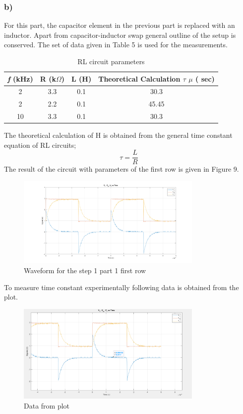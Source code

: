 \documentclass[letterpaper,12pt]{article}
\begin{document}
\subsubsection{b)}
For this part, the capacitor element in the previous part is replaced with an inductor. Apart from capacitor-inductor swap general outline of the setup is conserved.
The set of data given in Table 5 is used for the measurements.

\begin{table}[H]
\begin{center}
\caption{RL circuit parameters}
\vspace{2mm}
	\begin{tabular}{||c | c | c | c||} 
	 \hline
	 \emph{f} (kHz) & R (k\(\Omega\)) & L (H) & Theoretical Calculation \(\tau\) \(\mu\) ( sec) \\ [0.5ex] 
	 \hline\hline
	 2 & 3.3 & 0.1 & 30.3 \\ 
	 \hline
	 2 & 2.2 & 0.1 & 45.45 \\ 
	 \hline
	 10& 3.3 & 0.1  &   30.3 \\
	 \hline
\end{tabular}
\end{center}
\end{table}
The theoretical calculation of H is obtained from the general time constant equation of RL circuits;
\[\tau = \frac{L}{R}\]
The result of the circuit with parameters of the first row is given in Figure 9.

\begin{figure}[H]
	\centering
   \includegraphics[width=0.8\textwidth]{1b.png}
   \caption{Waveform for the step 1 part 1 first row}
\end{figure} 
To measure time constant experimentally following data is obtained from the plot.
\begin{figure}[H]
	\centering
   \includegraphics[width=0.8\textwidth]{1_b_plot_data.png}
   \caption{Data from plot}
\end{figure} 
\end{document}
